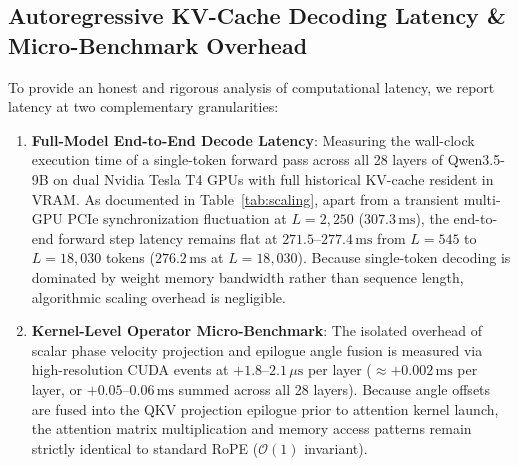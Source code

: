 \documentclass[11pt,a4paper]{article}
\theoremstyle{definition}
\begin{document}
\subsection{Autoregressive KV-Cache Decoding Latency \& Micro-Benchmark Overhead}
To provide an honest and rigorous analysis of computational latency, we report latency at two complementary granularities:
\begin{enumerate}
    \item \textbf{Full-Model End-to-End Decode Latency}: Measuring the wall-clock execution time of a single-token forward pass across all 28 layers of Qwen3.5-9B on dual Nvidia Tesla T4 GPUs with full historical KV-cache resident in VRAM. As documented in Table~\ref{tab:scaling}, apart from a transient multi-GPU PCIe synchronization fluctuation at $L=2,250$ ($307.3\,\text{ms}$), the end-to-end forward step latency remains flat at $271.5\text{--}277.4\,\text{ms}$ from $L=545$ to $L=18,030$ tokens ($276.2\,\text{ms}$ at $L=18,030$). Because single-token decoding is dominated by weight memory bandwidth rather than sequence length, algorithmic scaling overhead is negligible.
    \item \textbf{Kernel-Level Operator Micro-Benchmark}: The isolated overhead of scalar phase velocity projection and epilogue angle fusion is measured via high-resolution CUDA events at $+1.8\text{--}2.1\,\mu\text{s}$ per layer ($\approx +0.002\,\text{ms}$ per layer, or $+0.05\text{--}0.06\,\text{ms}$ summed across all 28 layers). Because angle offsets are fused into the QKV projection epilogue prior to attention kernel launch, the attention matrix multiplication and memory access patterns remain strictly identical to standard RoPE ($\mathcal{O}(1)$ invariant).
\end{enumerate}
\end{document}
